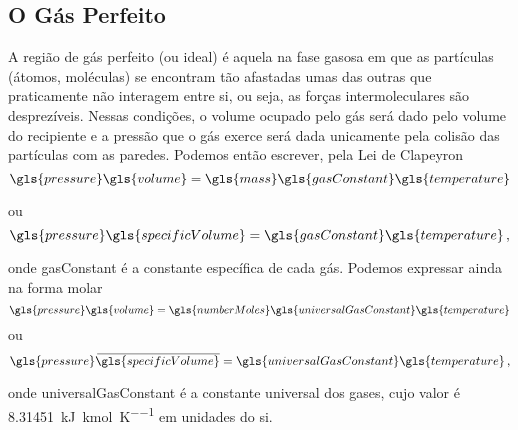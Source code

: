     \subsection{O Gás Perfeito}

    A região de gás perfeito (ou ideal) é aquela na fase gasosa em que as
    partículas (átomos, moléculas) se encontram tão afastadas umas das outras
    que praticamente não interagem entre si, ou seja, as forças
    intermoleculares são desprezíveis. Nessas condições, o volume ocupado pelo
    gás será dado pelo volume do recipiente e a pressão que o gás exerce será
    dada unicamente pela colisão das partículas com as paredes.  Podemos então
    escrever, pela Lei de Clapeyron
	\begin{equation} \label{eq:1.4}
        \gls{pressure}
        \gls{volume}
        =
        \gls{mass}
        \gls{gasConstant}
        \gls{temperature}
    \end{equation}

    ou
	\begin{equation}
        \gls{pressure}
        \gls{specificVolume}
        =
        \gls{gasConstant}
        \gls{temperature}\,,
    \end{equation}

    onde \gls{gasConstant} é a constante específica de cada gás. Podemos
    expressar ainda na forma molar
	\begin{equation} \label{eq:1.5}
        \gls{pressure}
        \gls{volume}
        =
        \gls{numberMoles}
        \gls{universalGasConstant}
        \gls{temperature}
    \end{equation}
    ou
	\begin{equation}
        \gls{pressure}
        \molar{\gls{specificVolume}}
        =
        \gls{universalGasConstant}
        \gls{temperature}\,,
    \end{equation}

    onde \gls{universalGasConstant} é a constante universal dos gases, cujo
    valor é  \SI{8.31451}{\kilo\joule\per\kilo\mol\per\kelvin} em unidades do
    \gls{si}.

